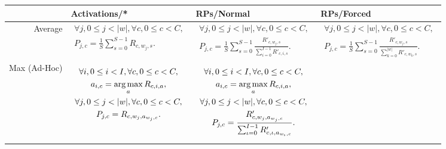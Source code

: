 \documentclass{article}
\def\argmax{\mathop{\rm arg\,max}}
\begin{document}
\begin{tabular}{r|p{1.7in}|p{1.7in}|p{1.7in}}
 & Activations/* & RPs/Normal & RPs/Forced \\
\hline
Average &
\begin{minipage}{1.7in}
\begin{gather*}
\forall j, 0 \le j < \vert w \vert, \forall c, 0 \le c < C,\\
P_{j,c} = \frac{1}{S} \sum_{s=0}^{S-1} R_{c,w_j,s}.
\end{gather*}
\end{minipage}
&
\begin{minipage}{1.7in}
\begin{gather*}
\forall j, 0 \le j < \vert w \vert, \forall c, 0 \le c < C,\\
P_{j,c} = \frac{1}{S} \sum_{s=0}^{S-1} 
\frac{R'_{c,w_j,s}}{\sum_{i=0}^{I-1} R'_{c,i,s}}.
\end{gather*}
\end{minipage}
& 
\begin{minipage}{1.7in}
\begin{gather*}
\forall j, 0 \le j < \vert w \vert, \forall c, 0 \le c < C,\\
P_{j,c} = \frac{1}{S} \sum_{s=0}^{S-1} 
\frac{R'_{c,w_j,s}}{\sum_{k=0}^{\vert w \vert} R'_{c,w_k,s}}.
\end{gather*}
\end{minipage}
\\
\hline
Max (Ad-Hoc) &
\begin{minipage}{1.7in}
\begin{gather*}
\forall i, 0 \le i < I, \forall c, 0 \le c < C,\\
a_{i,c} = \argmax_a R_{c,i,a}, \\
\forall j, 0 \le j < \vert w \vert, \forall c, 0 \le c < C,\\
P_{j,c} = R_{c,w_j,a_{w_j,c}}.
\end{gather*}
\end{minipage}
&
\begin{minipage}{1.7in}
\begin{gather*}
\forall i, 0 \le i < I, \forall c, 0 \le c < C,\\
a_{i,c} = \argmax_a R_{c,i,a}, \\
\forall j, 0 \le j < \vert w \vert, \forall c, 0 \le c < C,\\
P_{j,c} = \frac{R'_{c,w_j,a_{w_j,c}}}
{\sum_{\iota=0}^{I-1} R'_{c,\iota,a_{w_\iota,c}}}.
\end{gather*}

\end{minipage}
\end{tabular}
\end{document}
